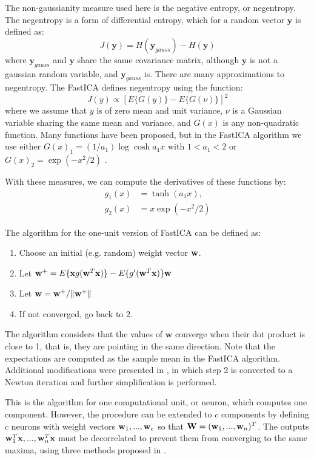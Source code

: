 The non-gaussianity measure used here is the negative entropy, or negentropy. The negentropy is a form of differential entropy, which for a random vector $\mathbf{y}$ is defined as: 
\begin{equation}
	J(\mathbf{y})=H(\mathbf{y}_{gauss})-H(\mathbf{y})
\end{equation}
where  $\mathbf{y}_{gauss}$ and $\mathbf{y}$ share the same covariance matrix, although $\mathbf{y}$ is not a gaussian random variable, and $\mathbf{y}_{gauss}$ is. There are many approximations to negentropy. The FastICA defines negentropy using the function: 
\begin{equation}
J(y)\propto [E\{G(y)\}-E\{G(\nu)\}]^2
\end{equation}
where we assume that $y$ is of zero mean and unit variance, $\nu$ is a Gaussian variable sharing the same mean and variance, and $G(x)$ is any non-quadratic function. Many functions have been proposed, but in the FastICA algorithm we use either $G(x)_1 = (1/a_1) \log\cosh a_1 x$ with $1<a_1<2$ or $G(x)_2 = \exp(-x^2/2)$ \cite{FastICA99}. 

With these measures, we can compute the derivatives of these functions by: 
\begin{align}
g_1(x) & =\tanh(a_1 x), \\
g_2(x) & = x\exp(- x^2/2)
\end{align} 

The algorithm for the one-unit version of FastICA can be defined \cite{FastICA99} as:
\begin{enumerate}
	\item Choose an initial (e.g. random) weight vector ${\bf w}$.
	\item Let  ${\bf w}^+=E\{{\bf x}g({\bf w}^T{\bf x})\}-E\{g'({\bf w}^T{\bf x})\}{\bf w}$
	\item Let  ${\bf w}={\bf w}^+/\Vert{\bf w}^+\Vert$
	\item If not converged, go back to 2.
\end{enumerate}

The algorithm considers that the values of $\mathbf{w}$ converge when their dot product is close to 1, that is, they are pointing in the same direction. Note that the expectations are computed as the sample mean in the FastICA algorithm. Additional modifications were presented in \cite{Hyvarinen2000}, in which step 2 is converted to a Newton iteration and further simplification is performed. 

This is the algorithm for one computational unit, or neuron, which computes one component. However, the procedure can be extended to $c$ components by defining $c$ neurons with weight vectors ${\bf w}_1,...,{\bf w}_c$ so that $\mathbf{W} = ({\bf w}_1,...,{\bf w}_n)^T$. The outputs ${\bf w}_1^T{\bf x},...,{\bf w}_n^T{\bf x}$ must be decorrelated to prevent them from converging to the same maxima, using three methods proposed in \cite{Hyvarinen2000}. 

